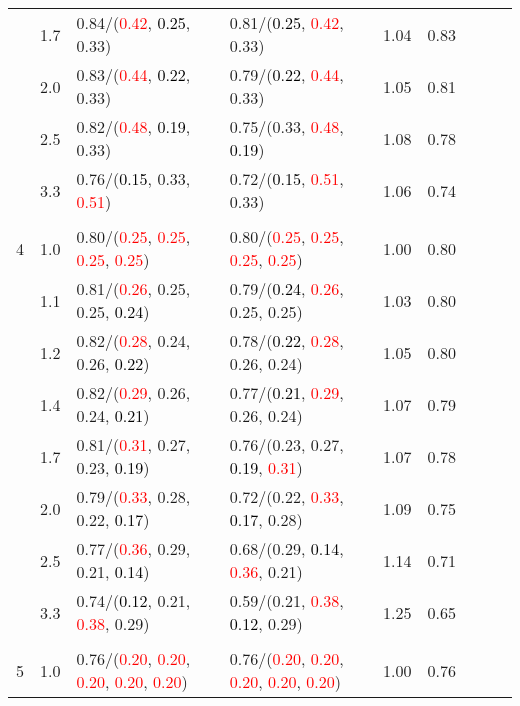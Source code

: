 \documentclass[10pt,a4paper]{report}
\begin{document}
\begin{table}[!htbp]
\begin{center}
{\begin{tabular}{ccllccccc}
			&1.7&0.84/(\textcolor{red}{0.42}, \textcolor{black}{0.25}, 0.33)&0.81/(\textcolor{black}{0.25}, \textcolor{red}{0.42}, 0.33)&1.04&0.83\\
			&2.0&0.83/(\textcolor{red}{0.44}, \textcolor{black}{0.22}, 0.33)&0.79/(\textcolor{black}{0.22}, \textcolor{red}{0.44}, 0.33)&1.05&0.81\\
			&2.5&0.82/(\textcolor{red}{0.48}, \textcolor{black}{0.19}, 0.33)&0.75/(0.33, \textcolor{red}{0.48}, \textcolor{black}{0.19})&1.08&0.78\\
			&3.3&0.76/(\textcolor{black}{0.15}, 0.33, \textcolor{red}{0.51})&0.72/(\textcolor{black}{0.15}, \textcolor{red}{0.51}, 0.33)&1.06&0.74\\
			&&&&\\
			4			&1.0&0.80/(\textcolor{red}{0.25}, \textcolor{red}{0.25}, \textcolor{red}{0.25}, \textcolor{red}{0.25})&0.80/(\textcolor{red}{0.25}, \textcolor{red}{0.25}, \textcolor{red}{0.25}, \textcolor{red}{0.25})&1.00&0.80\\
			&1.1&0.81/(\textcolor{red}{0.26}, 0.25, 0.25, \textcolor{black}{0.24})&0.79/(\textcolor{black}{0.24}, \textcolor{red}{0.26}, 0.25, 0.25)&1.03&0.80\\
			&1.2&0.82/(\textcolor{red}{0.28}, 0.24, 0.26, \textcolor{black}{0.22})&0.78/(\textcolor{black}{0.22}, \textcolor{red}{0.28}, 0.26, 0.24)&1.05&0.80\\
			&1.4&0.82/(\textcolor{red}{0.29}, 0.26, 0.24, \textcolor{black}{0.21})&0.77/(\textcolor{black}{0.21}, \textcolor{red}{0.29}, 0.26, 0.24)&1.07&0.79\\
			&1.7&0.81/(\textcolor{red}{0.31}, 0.27, 0.23, \textcolor{black}{0.19})&0.76/(0.23, 0.27, \textcolor{black}{0.19}, \textcolor{red}{0.31})&1.07&0.78\\
			&2.0&0.79/(\textcolor{red}{0.33}, 0.28, 0.22, \textcolor{black}{0.17})&0.72/(0.22, \textcolor{red}{0.33}, \textcolor{black}{0.17}, 0.28)&1.09&0.75\\
			&2.5&0.77/(\textcolor{red}{0.36}, 0.29, 0.21, \textcolor{black}{0.14})&0.68/(0.29, \textcolor{black}{0.14}, \textcolor{red}{0.36}, 0.21)&1.14&0.71\\
			&3.3&0.74/(\textcolor{black}{0.12}, 0.21, \textcolor{red}{0.38}, 0.29)&0.59/(0.21, \textcolor{red}{0.38}, \textcolor{black}{0.12}, 0.29)&1.25&0.65\\
			&&&&\\
			5			&1.0&0.76/(\textcolor{red}{0.20}, \textcolor{red}{0.20}, \textcolor{red}{0.20}, \textcolor{red}{0.20}, \textcolor{red}{0.20})&0.76/(\textcolor{red}{0.20}, \textcolor{red}{0.20}, \textcolor{red}{0.20}, \textcolor{red}{0.20}, \textcolor{red}{0.20})&1.00&0.76\\

\end{tabular}}
\end{center}
\end{table}
\end{document}
